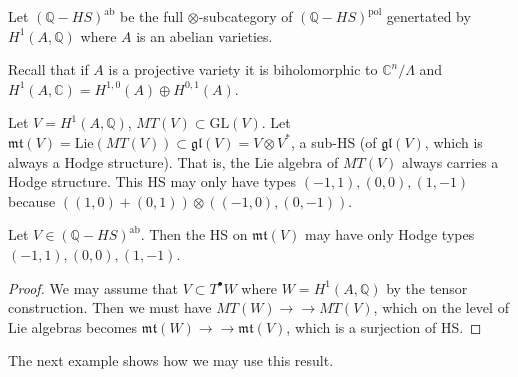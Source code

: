 \noindent
Let $(\mathbb{Q}-HS)^{\text{ab}}$
be the full $\otimes$-subcategory of
$(\mathbb{Q}-HS)^{\text{pol}}$
genertated by $H^1(A,\mathbb{Q})$
where $A$ is an abelian varieties.

Recall that if $A$ is a projective variety it
is biholomorphic to $\mathbb{C}^n/\Lambda$
and $H^1(A,\mathbb{C})=H^{1,0}(A) \oplus
H^{0,1}(A)$.

\medskip{}

Let $V=H^1(A,\mathbb{Q})$, $MT(V) \subset
\text{GL}(V)$.
Let
$\mathfrak{mt}(V)=\text{Lie}(MT(V))\subset
\mathfrak{gl}(V)=V \otimes V^*$,
a sub-HS (of $\mathfrak{gl}(V)$, which is
always a Hodge structure).
That is, the Lie algebra of $MT(V)$ always
carries a Hodge structure.
This HS may only have types
$(-1,1),(0,0),(1,-1)$
because $((1,0)+(0,1)) \otimes
((-1,0),(0,-1))$.

\begin{proposition}
\label{proposition-lie-algebra-of-mtv}
Let $V \in (\mathbb{Q}-HS)^{\text{ab}}$.
Then the HS on $\mathfrak{mt}(V)$ may have
only Hodge types
$(-1,1),(0,0),(1,-1)$.
\end{proposition}

\begin{proof}
We may assume that $V \subset T^\bullet W$
where $W=H^1(A,\mathbb{Q})$ by the tensor
construction.
Then we must have $MT(W)
\to\!\!\!\!\!\to MT(V)$,
which on the level of Lie algebras becomes
$\mathfrak{mt}(W)
\to\!\!\!\!\!\to\mathfrak{mt}(V)$,
which is a surjection of HS.
\end{proof}

\noindent
The next example shows how we may use this
result.

